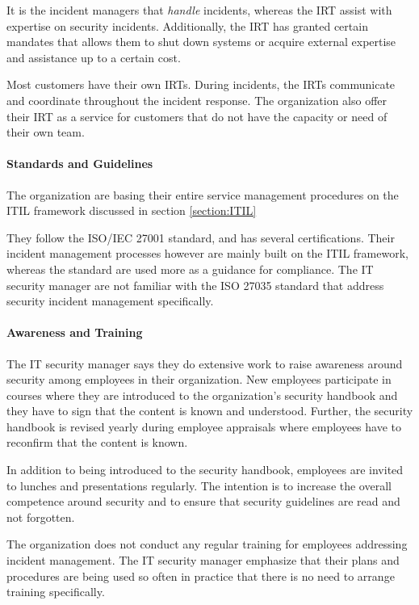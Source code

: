 It is the incident managers that \emph{handle} incidents, whereas the \ac{IRT} assist with expertise on security incidents. Additionally, the \ac{IRT} has granted certain mandates that allows them to shut down systems or acquire external expertise and assistance up to a certain cost.    

Most customers have their own \acp{IRT}. During incidents, the \acp{IRT} communicate and coordinate throughout the incident response. The organization also offer their \ac{IRT} as a service for customers that do not have the capacity or need of their own team. 

\paragraph{Standards and Guidelines}
The organization are basing their entire service management procedures on the ITIL framework discussed in section \ref{section:ITIL} 

They follow the ISO/IEC 27001 standard, and has several certifications. Their incident management processes however are mainly built on the ITIL framework, whereas the standard are used more as a guidance for compliance. The IT security manager are not familiar with the ISO 27035 standard that address security incident management specifically. 

\paragraph{Awareness and Training}
The IT security manager says they do extensive work to raise awareness around security among employees in their organization. New employees participate in courses where they are introduced to the organization's security handbook and they have to sign that the content is known and understood. Further, the security handbook is revised yearly during employee appraisals where employees have to reconfirm that the content is known.  

In addition to being introduced to the security handbook, employees are invited to lunches and presentations regularly. The intention is to increase the overall competence around security and to ensure that security guidelines are read and not forgotten. 

The organization does not conduct any regular training for employees addressing incident management. The IT security manager emphasize that their plans and procedures are being used so often in practice that there is no need to arrange training specifically. 

